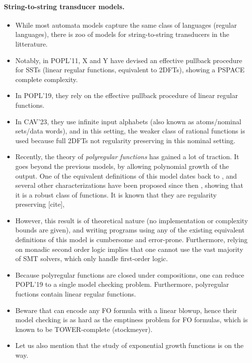 \paragraph{String-to-string transducer models.}
\begin{itemize}
  \item While most automata models capture the same 
    class of languages (regular languages), there is zoo of models for string-to-string transducers
    in the litterature. 
  \item Notably, in POPL'11, X and Y have devised an effective pullback procedure
    for SSTs (linear regular functions, equivalent to 2DFTs), showing a PSPACE
    complete complexity.
  \item In POPL'19, they
    rely on the effective pullback procedure of
    linear regular functions. 

  \item In CAV'23, they use infinite input alphabets (also known as atoms/nominal sets/data words),
    and in this setting, the weaker class of rational functions is used 
    because full 2DFTs not regularity preserving in this nominal setting.

  \item Recently, the theory of \emph{polyregular functions} has gained a lot of traction.
    It goes beyond the previous models, by allowing polynomial growth of the output.
    One of the equivalent definitions of this model dates back to \cite{ENMA02}, and 
    several other characterizations have been proposed since then
    \cite{bojanczyk2018polyregular,bojanczyk2019string,bojanczyk2023growth}, 
    showing that it is a robust class of functions.
    It is known that they are regularity preserving [cite],

  \item However, this result is of theoretical nature
    (no implementation or complexity bounds are given), and writing programs using
    any of the existing equivalent definitions of this 
    model is cumbersome and error-prone. Furthermore, relying on monadic
    second order logic implies that one cannot use the vast majority of SMT
    solvers, which only handle first-order logic.

  \item Because polyregular functions are closed under compositions,
    one can reduce POPL'19 to a single model checking problem. Furthermore,
    polyregular fuctions contain linear regular functions. 

  \item Beware that  can encode any FO formula 
    with a linear blowup, hence their model checking is as hard as
    the emptiness problem for FO formulas, which is known to be
    TOWER-complete (stockmeyer).

  \item Let us also mention that the study of exponential growth functions is on the way.
\end{itemize}



